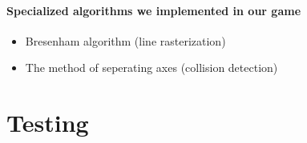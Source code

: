 \paragraph{Specialized algorithms we implemented in our game}
\begin{itemize}
\item Bresenham algorithm (line rasterization) \cite{graphics-algorithms}
\item The method of seperating axes (collision detection) \cite{collision-algorithms}

\end{itemize}

\section{Testing}
